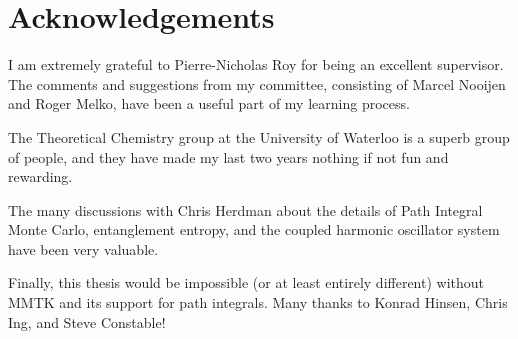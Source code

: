 \chapter*{Acknowledgements}

I am extremely grateful to Pierre-Nicholas Roy for being an excellent supervisor.
The comments and suggestions from my committee, consisting of Marcel Nooijen and Roger Melko, have been a useful part of my learning process.

The Theoretical Chemistry group at the University of Waterloo is a superb group of people, and they have made my last two years nothing if not fun and rewarding.

The many discussions with Chris Herdman about the details of Path Integral Monte Carlo, entanglement entropy, and the coupled harmonic oscillator system have been very valuable.

Finally, this thesis would be impossible (or at least entirely different) without MMTK and its support for path integrals.
Many thanks to Konrad Hinsen, Chris Ing, and Steve Constable!
